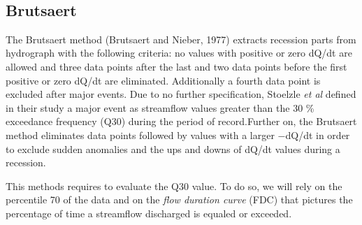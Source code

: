 \documentclass[11pt]{article}
\begin{document}
    \begin{center}
    \end{center}
    { \hspace*{\fill} \\}
    
    \subsection{Brutsaert}\label{brutsaert}

The Brutsaert method (Brutsaert and Nieber, 1977) extracts recession
parts from hydrograph with the following criteria: no values with
positive or zero dQ/dt are allowed and three data points after the last
and two data points before the first positive or zero dQ/dt are
eliminated. Additionally a fourth data point is excluded after major
events. Due to no further specification, Stoelzle \emph{et al} defined
in their study a major event as streamflow values greater than the 30 \%
exceedance frequency (Q30) during the period of record.Further on, the
Brutsaert method eliminates data points followed by values with a larger
−dQ/dt in order to exclude sudden anomalies and the ups and downs of
dQ/dt values during a recession.

This methods requires to evaluate the Q30 value. To do so, we will rely
on the percentile 70 of the data and on the \emph{flow duration curve}
(FDC) that pictures the percentage of time a streamflow discharged is
equaled or exceeded.
\end{document}
